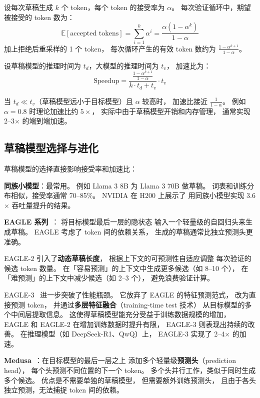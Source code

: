 设每次草稿生成 $k$ 个 token，每个 token 的接受率为 $\alpha$。
每次验证循环中，期望被接受的 token 数为：
\begin{equation}
  \mathbb{E}[\text{accepted tokens}] = \sum_{i=1}^{k} \alpha^i = \frac{\alpha(1 - \alpha^k)}{1 - \alpha}
\end{equation}
加上拒绝后重采样的 1 个 token，
每次循环产生的有效 token 数约为 $\frac{1 - \alpha^{k+1}}{1 - \alpha}$。

设草稿模型的推理时间为 $t_d$，大模型的推理时间为 $t_v$，
加速比为：
\begin{equation}
  \text{Speedup} = \frac{\frac{1 - \alpha^{k+1}}{1 - \alpha}}{k \cdot t_d + t_v} \cdot t_v
\end{equation}

当 $t_d \ll t_v$（草稿模型远小于目标模型）且 $\alpha$ 较高时，
加速比接近 $\frac{1}{1-\alpha}$。
例如 $\alpha = 0.8$ 时理论加速比约 $5\times$，
实际中由于草稿模型开销和内存管理，
通常实现 2--3$\times$ 的端到端加速。

\subsection{草稿模型选择与进化}

草稿模型的选择直接影响接受率和加速比：

\textbf{同族小模型}：最常用。
例如 Llama 3 8B 为 Llama 3 70B 做草稿。
词表和训练分布相似，接受率通常 70--85\%。
NVIDIA 在 H200 上展示了
用同族小模型实现 3.6$\times$ 吞吐量提升的结果。

\textbf{EAGLE 系列}~\cite{li2024eagle}：
将目标模型最后一层的隐状态
输入一个轻量级的自回归头来生成草稿。
EAGLE 考虑了 token 间的依赖关系，
生成的草稿通常比独立预测头更准确。

EAGLE-2 引入了\textbf{动态草稿长度}，
根据上下文的可预测性自适应调整
每次验证的候选 token 数量。
在「容易预测」的上下文中生成更多候选（如 8--10 个），
在「难预测」的上下文中减少候选（如 2--3 个），
避免浪费验证计算。

EAGLE-3~\cite{li2025eagle3} 进一步突破了性能瓶颈。
它放弃了 EAGLE 的特征预测范式，
改为直接预测 token，
并通过\textbf{多层特征融合}（training-time test 技术）
从目标模型的多个中间层提取信息。
这使得草稿模型能充分受益于训练数据规模的增加，
EAGLE 和 EAGLE-2 在增加训练数据时提升有限，
EAGLE-3 则表现出持续的改善。
在推理模型（如 DeepSeek-R1、QwQ）上，
EAGLE-3 实现了 2--4$\times$ 的加速。

\textbf{Medusa}~\cite{cai2024medusa}：在目标模型的最后一层之上
添加多个轻量级\textbf{预测头}（prediction head），
每个头预测不同位置的下一个 token。
多个头并行工作，类似于同时生成多个候选。
优点是不需要单独的草稿模型，
但需要额外训练预测头，
且由于各头独立预测，无法捕捉 token 间的依赖。

